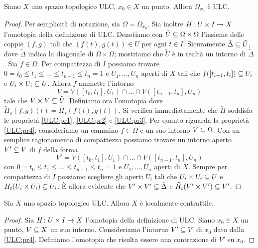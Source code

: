 \begin{proposition}
Siano $X$ uno spazio topologico ULC, $x_0\in X$ un punto. Allora $\Omega_{x_0}$ è ULC.
\end{proposition}
\begin{proof}
Per semplicità di notazione, sia $\Omega=\Omega_{x_0}$. Sia inoltre $H\colon U\times I\to X$ l'omotopia della definizione di ULC. Denotiamo con $\tilde{U}\subseteq\Omega\times\Omega$ l'insieme delle coppie $(f,g)$ tali che $(f(t),g(t))\in U$ per ogni $t\in I$. Sicuramente $\tilde\Delta\subseteq\tilde U$, dove $\tilde\Delta$ indica la diagonale di $\Omega\times\Omega$; mostriamo che $\tilde U$ è in realtà un intorno di $\tilde\Delta$. Sia $f\in\Omega$. Per compattezza di $I$ possiamo trovare $0=t_0\le t_1\le\ldots\le t_{n-1}\le t_n=1$ e $U_1,\ldots,U_n$ aperti di $X$ tali che $f([t_{i-1},t_i])\subseteq U_i$ e $U_i\times U_i\subseteq U$. Allora $f$ ammette l'intorno
$$
V=V([t_0,t_1],U_1)\cap\ldots\cap V([t_{n-1},t_n],U_n)
$$
tale che $V\times V\subseteq\tilde{U}$. Definiamo ora l'omotopia
dove $\tilde{H}_s(f,g)(t)=H_s(f(t),g(t))$. Si verifica immediatamente che $\tilde{H}$ soddisfa le proprietà \ref{ULC:pr1}, \ref{ULC:pr2} e \ref{ULC:pr3}. Per quanto riguarda la proprietà \ref{ULC:pr4}, consideriamo un cammino $f\in\Omega$ e un suo intorno $V\subseteq\Omega$. Con un semplice ragionamento di compattezza possiamo trovare un intorno aperto $V'\subseteq V$ di $f$ della forma
$$
V'=V([t_0,t_1],U_1)\cap\ldots\cap V([t_{n-1},t_n],U_n)
$$
con $0=t_0\le t_1\le\ldots\le t_{n-1}\le t_n=1$ e $U_1,\ldots,U_n$ aperti di $X$. Sempre per compattezza di $I$ possiamo scegliere gli aperti $U_i$ tali che $U_i\times U_i\subseteq U$ e $H_t(U_i\times U_i)\subseteq U_i$. È allora evidente che $V'\times V'\subseteq\tilde\Delta$ e $\tilde{H}_t(V'\times V')\subseteq V'$.
\end{proof}

\begin{proposition}
Sia $X$ uno spazio topologico ULC. Allora $X$ è localmente contrattile.
\end{proposition}
\begin{proof}
Sia $H\colon U\times I\to X$ l'omotopia della definizione di ULC. Siano $x_0\in X$ un punto, $V\subseteq X$ un suo intorno. Consideriamo l'intorno $V'\subseteq V$ di $x_0$ dato dalla \ref{ULC:pr4}. Definiamo l'omotopia
che risulta essere una contrazione di $V'$ su $x_0$.
\end{proof}

